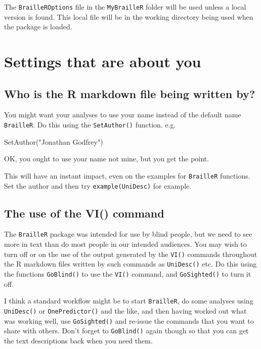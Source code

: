 \documentclass[
]{book}
\newenvironment{Shaded}{\begin{snugshade}}{\end{snugshade}}
\newcommand{\FunctionTok}[1]{\textcolor[rgb]{0.00,0.00,0.00}{#1}}
\newcommand{\NormalTok}[1]{#1}
\newcommand{\StringTok}[1]{\textcolor[rgb]{0.31,0.60,0.02}{#1}}
\begin{document}
The \texttt{BrailleROptions} file in the \texttt{MyBrailleR} folder will be used unless a local version is found. This local file will be in the working directory being used when the package is loaded.

\hypertarget{settings-that-are-about-you}{%
\section{Settings that are about you}\label{settings-that-are-about-you}}

\hypertarget{who-is-the-r-markdown-file-being-written-by}{%
\subsection{Who is the R markdown file being written by?}\label{who-is-the-r-markdown-file-being-written-by}}

You might want your analyses to use your name instead of the default name \texttt{BrailleR}. Do this using the \texttt{SetAuthor()} function. e.g.

\begin{Shaded}
\begin{Highlighting}[]
\FunctionTok{SetAuthor}\NormalTok{(}\StringTok{"Jonathan Godfrey"}\NormalTok{)}
\end{Highlighting}
\end{Shaded}

OK, you ought to use your name not mine, but you get the point.

This will have an instant impact, even on the examples for \texttt{BrailleR} functions. Set the author and then try \texttt{example(UniDesc)} for example.

\hypertarget{the-use-of-the-vi-command}{%
\subsection{The use of the VI() command}\label{the-use-of-the-vi-command}}

The \texttt{BrailleR} package was intended for use by blind people, but we need to see more in text than do most people in our intended audiences. You may wish to turn off or on the use of the output generated by the \texttt{VI()} commands throughout the R markdown files written by such commands as \texttt{UniDesc()} etc. Do this using the functions \texttt{GoBlind()} to use the \texttt{VI()} command, and \texttt{GoSighted()} to turn it off.

I think a standard workflow might be to start \texttt{BrailleR}, do some analyses using \texttt{UniDesc()} or \texttt{OnePredictor()} and the like, and then having worked out what was working well, use \texttt{GoSighted()} and re-issue the commands that you want to share with others. Don't forget to \texttt{GoBlind()} again though so that you can get the text descriptions back when you need them.
\end{document}
